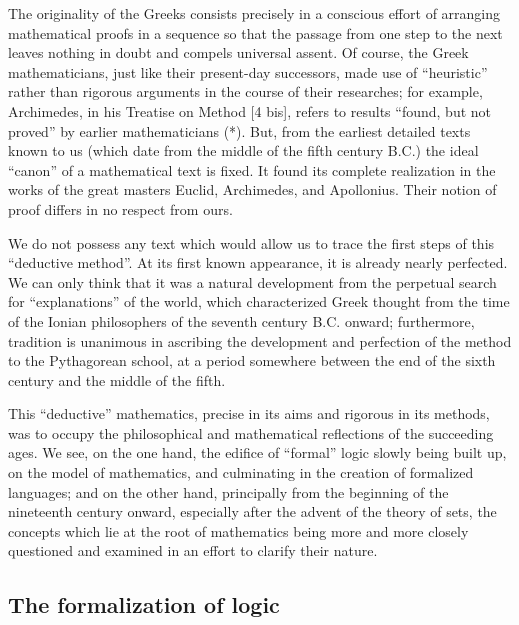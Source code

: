 The originality of the Greeks consists precisely in a conscious effort of arranging mathematical proofs in a sequence so that the passage from one step to the next leaves nothing in doubt and compels universal assent. Of course, the Greek mathematicians, just like their present-day successors, made use of ``heuristic'' rather than rigorous arguments in the course of their researches; for example, Archimedes, in his Treatise on Method {[}4 bis{]}, refers to results ``found, but not proved'' by earlier mathematicians (*). But, from the earliest detailed texts known to us (which date from the middle of the fifth century B.C.) the ideal ``canon'' of a mathematical text is fixed. It found its complete realization in the works of the great masters Euclid, Archimedes, and Apollonius. Their notion of proof differs in no respect from ours.

We do not possess any text which would allow us to trace the first steps of this ``deductive method''. At its first known appearance, it is already nearly perfected. We can only think that it was a natural development from the perpetual search for ``explanations'' of the world, which characterized Greek thought from the time of the Ionian philosophers of the seventh century B.C. onward; furthermore, tradition is unanimous in ascribing the development and perfection of the method to the Pythagorean school, at a period somewhere between the end of the sixth century and the middle of the fifth.

This ``deductive'' mathematics, precise in its aims and rigorous in its methods, was to occupy the philosophical and mathematical reflections of the succeeding ages. We see, on the one hand, the edifice of ``formal'' logic slowly being built up, on the model of mathematics, and culminating in the creation of formalized languages; and on the other hand, principally from the beginning of the nineteenth century onward, especially after the advent of the theory of sets, the concepts which lie at the root of mathematics being more and more closely questioned and examined in an effort to clarify their nature.

\subsection*{The formalization of logic}


